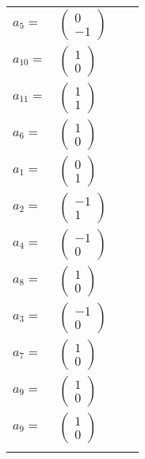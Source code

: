 \documentclass[1p]{elsarticle_modified}
\theoremstyle{definition}
\begin{document}
\begin{tabular}{m{7pt} m{180pt} m{7pt} m{180pt} }
\flushright $a_{5}=$&$\begin{pmatrix}0\\-1\end{pmatrix}$ \\
\flushright $a_{10}=$&$\begin{pmatrix}1\\0\end{pmatrix}$ \\
\flushright $a_{11}=$&$\begin{pmatrix}1\\1\end{pmatrix}$ \\
\flushright $a_{6}=$&$\begin{pmatrix}1\\0\end{pmatrix}$ \\
\flushright $a_{1}=$&$\begin{pmatrix}0\\1\end{pmatrix}$ \\
\flushright $a_{2}=$&$\begin{pmatrix}-1\\1\end{pmatrix}$ \\
\flushright $a_{4}=$&$\begin{pmatrix}-1\\0\end{pmatrix}$ \\
\flushright $a_{8}=$&$\begin{pmatrix}1\\0\end{pmatrix}$ \\
\flushright $a_{3}=$&$\begin{pmatrix}-1\\0\end{pmatrix}$ \\
\flushright $a_{7}=$&$\begin{pmatrix}1\\0\end{pmatrix}$ \\
\flushright $a_{9}=$&$\begin{pmatrix}1\\0\end{pmatrix}$\\ \flushright $a_{9}=$&$\begin{pmatrix}1\\0\end{pmatrix}$\\&\end{tabular}
\end{document}
